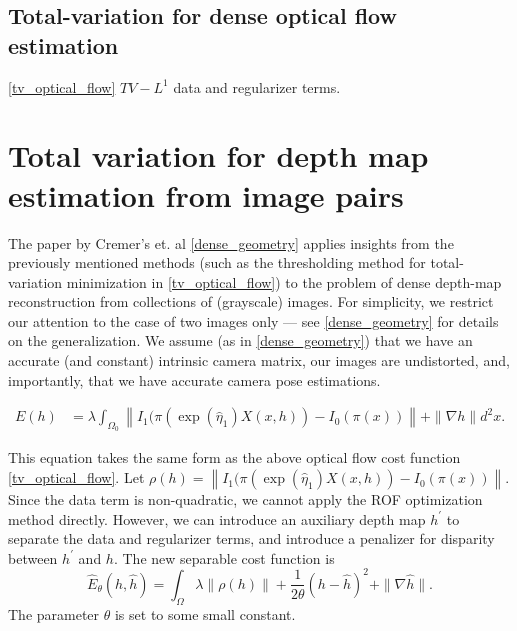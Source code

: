 \documentclass[conference]{IEEEtran}
\begin{document}

\subsection{Total-variation for dense optical flow estimation}
\ref{tv_optical_flow}
$TV-L^1$ data and regularizer terms.

\section{Total variation for depth map estimation from image pairs}
The paper by Cremer's et. al \ref{dense_geometry} applies insights from the previously mentioned methods (such as
the thresholding method for total-variation minimization in \ref{tv_optical_flow}) to the problem of dense depth-map
reconstruction from collections of (grayscale) images. For simplicity, we restrict our attention to the case of two images only ---
see \ref{dense_geometry} for details on the generalization. We assume (as in \ref{dense_geometry}) that we have an accurate (and constant) intrinsic camera matrix,
our images are undistorted, and, importantly, that we have accurate camera pose estimations.

\begin{equation}
\begin{split}
E(h) &= \lambda \int_{\Omega_0}\left\|I_1(\pi(\exp(\hat{\eta}_1)X(x,h)) - I_0(\pi(x))\right\|
     + \|\nabla h\| d^2 x.
\end{split}
\end{equation}

This equation takes the same form as the above optical flow cost function \ref{tv_optical_flow}. Let $\rho(h) = \left\|I_1(\pi(\exp(\hat{\eta}_1)X(x,h)) - I_0(\pi(x))\right\|$. Since the data term is non-quadratic, we
cannot apply the ROF optimization method directly. However, we can introduce
an auxiliary depth map $h^\prime$ to separate the data and regularizer terms,
and introduce a penalizer for disparity between $h^\prime$ and $h$. The
new separable cost function is
\begin{equation}\label{separable_cost}
    \hat{E}_\theta(h, \hat{h}) = \int_\Omega \lambda \|\rho(h)\| + \frac{1}{2\theta}(h - \hat{h})^2 + \|\nabla \hat{h}\|.
\end{equation}
The parameter $\theta$ is set to some small constant.
\end{document}
